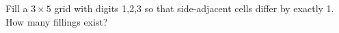 Fill a $3\times5$ grid with digits 1,2,3 so that side-adjacent cells differ by exactly 1. How many fillings exist?
